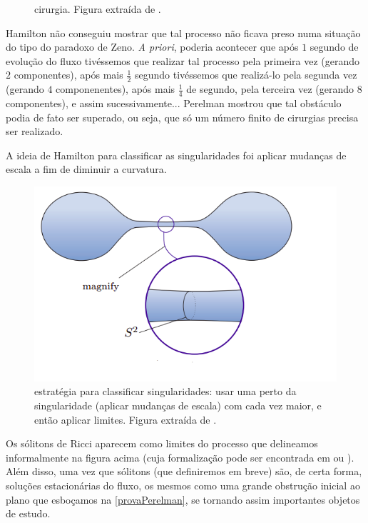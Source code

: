 \begin{oobs}
\begin{figure}[H]
        \caption{cirurgia. Figura extraída de .}
        \end{figure}
        Hamilton não conseguiu mostrar que tal processo não ficava preso numa situação do tipo do paradoxo de Zeno. \emph{A priori}, poderia acontecer que após $1$ segundo de evolução do fluxo tivéssemos que realizar tal processo pela primeira vez (gerando $2$ componentes), após mais $\frac{1}{2}$ segundo tivéssemos que realizá-lo pela segunda vez (gerando $4$ componenentes), após mais $\frac{1}{4}$ de segundo, pela terceira vez (gerando $8$ componentes), e assim sucessivamente... Perelman mostrou que tal obstáculo podia de fato ser superado, ou seja, que só um número finito de cirurgias precisa ser realizado. 
        \end{oobs}
        
        \begin{oobs}
        A ideia de Hamilton para classificar as singularidades foi aplicar mudanças de escala a fim de diminuir a curvatura.
        \begin{figure}[H]
        \centering
        \includegraphics[scale=.4]{blowup.png}
        \vspace{-0.8cm}
        \caption{estratégia para classificar singularidades: usar uma  perto da singularidade (aplicar mudanças de escala) com  cada vez maior, e então aplicar limites. Figura extraída de .}
        \end{figure}
        Os sólitons de Ricci aparecem como limites do processo que delineamos informalmente na figura acima (cuja formalização pode ser encontrada em  ou ). Além disso, uma vez que sólitons (que definiremos em breve) são, de certa forma, soluções estacionárias do fluxo, os mesmos  como uma grande obstrução inicial ao plano que esboçamos na \cref{provaPerelman}, se tornando assim importantes objetos de estudo.  
        \end{oobs}

